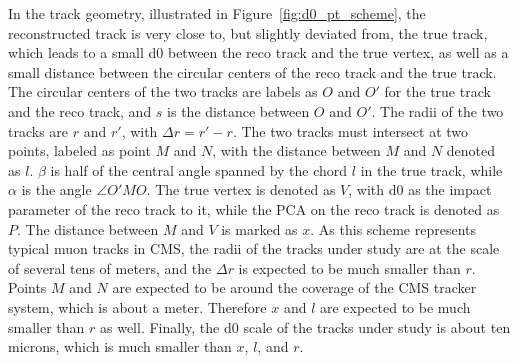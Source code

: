 In the track geometry, illustrated in Figure~\ref{fig:d0_pt_scheme}, 
the reconstructed track is very close to, but slightly deviated from, the true track,
which leads to a small d0 between the reco track and the true vertex, 
as well as a small distance between the circular centers of the reco track and the true track.
The circular centers of the two tracks are labels as $O$ and $O'$ for the true track and the reco track,
and $s$ is the distance between $O$ and $O'$. 
The radii of the two tracks are $r$ and $r'$, with $\Delta{}r = r' - r$.
The two tracks must intersect at two points, labeled as point $M$ and $N$, 
with the distance between $M$ and $N$ denoted as $l$.
$\beta$ is half of the central angle spanned by the chord $l$ in the true track,
while $\alpha$ is the angle $\angle O'MO$.
The true vertex is denoted as $V$, with d0 as the impact parameter of the reco track to it,
while the PCA on the reco track is denoted as $P$.
The distance between $M$ and $V$ is marked as $x$.
As this scheme represents typical muon tracks in CMS, 
the radii of the tracks under study are at the scale of several tens of meters,
and the $\Delta{}r$ is expected to be much smaller than $r$.
Points $M$ and $N$ are expected to be around the coverage of the CMS tracker system, which is about a meter.
Therefore $x$ and $l$ are expected to be much smaller than $r$ as well.
Finally, the d0 scale of the tracks under study is about ten microns, which is much smaller than $x$, $l$, and $r$. 

